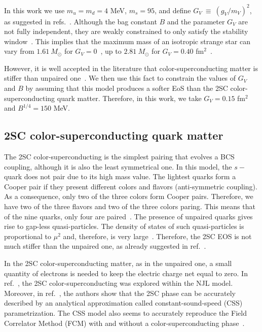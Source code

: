 \documentclass[%
reprint,
superscriptaddress,
nofootinbib,
amsmath,
amssymb,
aps,
floatfix,
showkeys,
]{revtex4-2}
\begin{document}
In this work we use $m_u = m_d = 4$ MeV, $m_s = 95$, and define $G_V~\equiv~(g_V/m_V)^2$, as suggested in refs.~\cite{Lopes_2021,Lopes_2021b}. Although the bag constant $B$ and the parameter $G_V$ are not fully independent, they are weakly constrained to  only satisfy the stability window~\cite{Torres_2013}. This implies that the maximum mass of an isotropic strange star can vary from $1.61 \ M_\odot$ for $G_V = 0$~\cite{Lopes_2021}, up to $2.81 \ M_\odot$ for $G_V = 0.40$ fm$^2$~\cite{Lopes_ApJ}.

However, it is well accepted in the literature that color-superconducting matter is stiffer than unpaired one~\cite{Alford2008, Lugones2004, Ruster2004, Linares2006, Lorenzatto2022}.  We then use this fact to constrain the values of $G_V$ and $B$ by assuming that this model produces a softer EoS than the 2SC color-superconducting quark matter. Therefore, in this work, we take $G_V = 0.15$ fm$^2$ and $B^{1/4} = 150$ MeV.
\subsection{2SC color-superconducting quark matter}
The 2SC color-superconducting is the simplest pairing that evolves a BCS coupling, although it is also the least symmetrical one. In this model, the $s-$quark does not pair due to its high mass value. The lightest quarks form a Cooper pair if they present different colors and flavors (anti-symmetric coupling). As a consequence, only two of the three colors form Cooper pairs. Therefore, we have two of the three flavors and two of the three colors paring. This means that of the nine quarks, only four are paired~\cite {Ruster2004, Alford2008}. The presence of unpaired quarks gives rise to gap-less quasi-particles. The density of states of such quasi-particles is proportional to $\mu^2$ and, therefore, is very large~\cite{Shovkovy_2005}. Therefore, the 2SC EOS is not much stiffer than the unpaired one, as already suggested in ref.~\cite{Ruster2004}.

In the 2SC color-superconducting matter, as in the unpaired one, a small quantity of electrons is needed to keep the electric charge net equal to zero. In ref.~\cite{Agrawal2010}, the 2SC color-superconducting was explored within the NJL model. Moreover, in ref.~\cite{Zdunik2013}, the authors show that the 2SC phase can be accurately described by an analytical approximation called constant-sound-speed (CSS) parametrization. The CSS model also seems to accurately reproduce the Field Correlator Method (FCM) with and without a color-superconducting phase~\cite{Alford2015, Burgio2016}.
\end{document}
